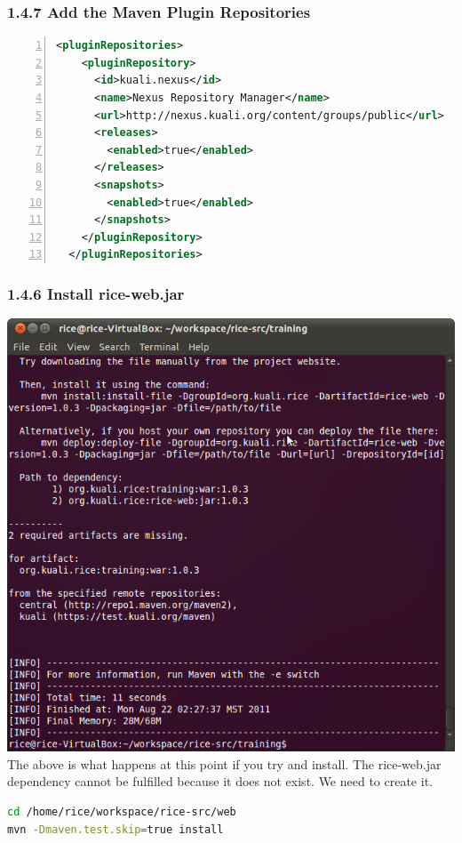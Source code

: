 \subsubsection*{1.4.7 Add the Maven Plugin Repositories}
\begin{lstlisting}[numbers=left,language=xml,basicstyle=\scriptsize,backgroundcolor=\color{ubergray},caption={training/pom.xml},frame=single,breaklines=true
]
  <pluginRepositories>
    <pluginRepository> 
      <id>kuali.nexus</id> 
      <name>Nexus Repository Manager</name> 
      <url>http://nexus.kuali.org/content/groups/public</url> 
      <releases> 
        <enabled>true</enabled> 
      </releases> 
      <snapshots> 
        <enabled>true</enabled> 
      </snapshots> 
    </pluginRepository>
  </pluginRepositories> 
\end{lstlisting}

\subsubsection*{1.4.6 Install rice-web.jar}
\includegraphics[width=\textwidth]{images/Screenshot6.png}
The above is what happens at this point if you try and install. The
rice-web.jar dependency cannot be fulfilled because it does not
exist. We need to create it.

\begin{lstlisting}[language=bash,basicstyle=\scriptsize,backgroundcolor=\color{ubergray},caption={Maven
  commands},frame=single,breaklines=true
]
cd /home/rice/workspace/rice-src/web
mvn -Dmaven.test.skip=true install
\end{lstlisting}

